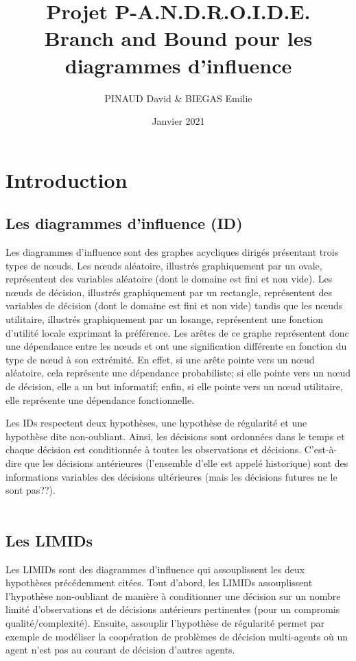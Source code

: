 \documentclass[12pt]{article}
\title{Projet P-A.N.D.R.O.I.D.E.\\
\bigbreak\textbf{Branch and Bound pour les diagrammes d'influence}}
\author{PINAUD David \& BIEGAS Emilie}
\date{Janvier 2021}
\affil{Université Sorbonne Sciences}
\begin{document}
\maketitle

\renewcommand{\contentsname}{Table des Matières}
\pagebreak
\tableofcontents
\pagebreak

\section{Introduction}

\subsection{Les diagrammes d'influence (ID)}
Les diagrammes d'influence sont des graphes acycliques dirigés présentant trois types de nœuds. 
Les nœuds aléatoire, illustrés graphiquement par un ovale, représentent des variables aléatoire (dont le domaine est fini et non vide). 
Les nœuds de décision, illustrés graphiquement par un rectangle, représentent des variables de décision (dont le domaine est fini et non vide) tandis que les nœuds utilitaire, illustrés graphiquement par un losange, représentent une fonction d'utilité locale exprimant la préférence.
Les arêtes de ce graphe représentent donc une dépendance entre les nœuds et ont une signification différente en fonction du type de nœud à son extrémité.
En effet, si une arête pointe vers un nœud aléatoire, cela représente une dépendance probabiliste; si elle pointe vers un nœud de décision, elle a un but informatif; enfin, si elle pointe vers un nœud utilitaire, elle représente une dépendance fonctionnelle.

Les IDs respectent deux hypothèses, une hypothèse de régularité et une hypothèse dite non-oubliant.
Ainsi, les décisions sont ordonnées dans le temps et chaque décision est conditionnée à toutes les observations et décisions.
C'est-à-dire que les décisions antérieures (l'ensemble d'elle est appelé historique) sont des informations variables des décisions ultérieures (mais les décisions futures ne le sont pas??).
\\\\

\subsection{Les LIMIDs}
 Les LIMIDs sont des diagrammes d'influence qui assouplissent les deux hypothèses précédemment citées. Tout d'abord, les LIMIDs assouplissent l'hypothèse non-oubliant de manière à conditionner une décision sur un nombre limité d'observations et de décisions antérieurs pertinentes (pour un compromis qualité/complexité).
Ensuite, assouplir l'hypothèse de régularité permet par exemple de modéliser la coopération de problèmes de décision multi-agents où un agent n'est pas au courant de décision d'autres agents.
\end{document}
